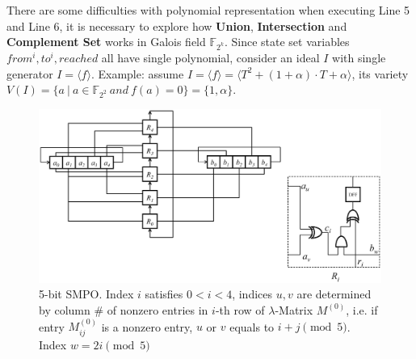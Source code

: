 There are some difficulties with polynomial representation when executing Line 5 and Line 6, it is necessary to explore
how \textbf{Union}, \textbf{Intersection} and \textbf{Complement Set} works in Galois field $\mathbb{F}_{2^k}$. Since
state set variables $from^i, to^i, reached$ all have single polynomial, consider an ideal $I$ with single generator $I = \langle f\rangle $.
Example: assume $I = \langle f\rangle  = \langle T^2 + (1+\alpha)\cdot T+\alpha\rangle $, its variety $V(I) = \{a\ |\ a \in \mathbb{F}_{2^2}\ and\ f(a) = 0\} = \{1, \alpha\}$.


\begin{figure}[tb]
\begin{center}
\includegraphics[width=\textwidth]{mySMPO.eps}

\end{center}
\caption{5-bit SMPO. Index $i$ satisfies $0<i<4$, indices $u,v$ are determined by column \# of nonzero entries in $i$-th row of $\lambda$-Matrix $M^{(0)}$, i.e. if entry $M_{ij}^{(0)}$ is a nonzero entry, $u$ or $v$ equals to $i+j \pmod 5$. Index $w = 2i\pmod 5$}
\label{fig:SMPO}
\end{figure}


